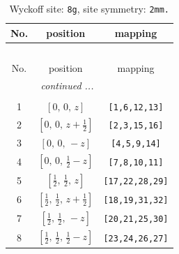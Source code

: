 \documentclass[fleqn,8pt]{jsarticle}
\begin{document}
\begin{longtable}{ccc}
\caption{Wyckoff site: {\tt 8g}, site symmetry: {\tt 2mm.}}
 \\
 \hline \hline
No. & position & mapping \\ \hline \endfirsthead

\multicolumn{2}{l}{\tablename\ \thetable{}} \\
 \hline \hline
No. & position & mapping \\ \hline \endhead

 \hline \hline
\multicolumn{2}{r}{\footnotesize\it continued ...} \\ \endfoot

 \hline \hline
\multicolumn{2}{r}{} \\ \endlastfoot

1 & $\left[ 0,\, 0,\, z \right]$ & {\tt [1,6,12,13]} \\ \hline
2 & $\left[ 0,\, 0,\, z + \frac{1}{2} \right]$ & {\tt [2,3,15,16]} \\ \hline
3 & $\left[ 0,\, 0,\, - z \right]$ & {\tt [4,5,9,14]} \\ \hline
4 & $\left[ 0,\, 0,\, \frac{1}{2} - z \right]$ & {\tt [7,8,10,11]} \\ \hline
5 & $\left[ \frac{1}{2},\, \frac{1}{2},\, z \right]$ & {\tt [17,22,28,29]} \\ \hline
6 & $\left[ \frac{1}{2},\, \frac{1}{2},\, z + \frac{1}{2} \right]$ & {\tt [18,19,31,32]} \\ \hline
7 & $\left[ \frac{1}{2},\, \frac{1}{2},\, - z \right]$ & {\tt [20,21,25,30]} \\ \hline
8 & $\left[ \frac{1}{2},\, \frac{1}{2},\, \frac{1}{2} - z \right]$ & {\tt [23,24,26,27]} \\
\end{longtable}
\renewcommand{\arraystretch}{1.2}
\end{document}
